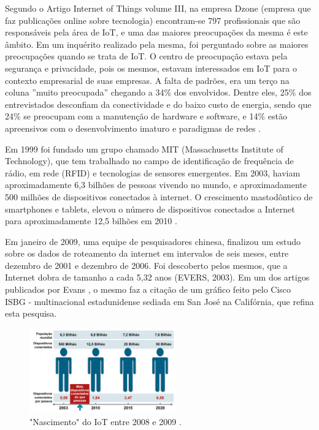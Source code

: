 \documentclass[journal]{IEEEtran}
\begin{document}
Segundo o Artigo Internet of Things volume III, na empresa Dzone (empresa que faz publicações online sobre tecnologia) encontram-se 797 profissionais que são responsáveis pela área de IoT, e uma das maiores preocupações da mesma é este âmbito. Em um inquérito realizado pela mesma, foi perguntado sobre as maiores preocupações quando se trata de IoT. O centro de preocupação estava pela segurança e privacidade, pois os mesmos, estavam interessados em IoT para o contexto empresarial de suas empresas. A falta de padrões, era um terço na coluna ''muito preocupada'' chegando a 34\% dos envolvidos. Dentre eles, 25\% dos entrevistados desconfiam da conectividade e do baixo custo de energia, sendo que 24\% se preocupam com a manutenção de hardware e software, e 14\% estão apreensivos com o desenvolvimento imaturo e paradigmas de redes \cite[p.~4]{Evans}.

Em 1999 foi fundado um grupo chamado MIT (Massachusetts Institute of Technology), que tem trabalhado no campo de identificação de frequência de rádio, em rede (RFID) e tecnologias de sensores emergentes. Em 2003, haviam aproximadamente 6,3 bilhões de pessoas vivendo no mundo, e aproximadamente 500 milhões de dispositivos conectados à internet. O crescimento mastodôntico de smartphones e tablets, elevou o número de dispositivos conectados a Internet para aproximadamente 12,5 bilhões em 2010 \cite[p.~3]{Evans}.

Em janeiro de 2009, uma equipe de pesquisadores chinesa, finalizou um estudo sobre os dados de roteamento da internet em intervalos de seis meses, entre dezembro de 2001 e dezembro de 2006. Foi descoberto pelos mesmos, que a Internet dobra de tamanho a cada 5,32 anos (EVERS, 2003). Em um dos artigos publicados por Evans \cite{Evans}, o mesmo faz a citação de um gráfico feito pelo Cisco ISBG - multinacional estadunidense sediada em San José na Califórnia, que refina esta pesquisa. 

\begin{figure}[h]
\centering
\includegraphics[width=2.5in]{um}
\caption{"Nascimento" do IoT entre 2008 e 2009 \cite{Evans}.}
\label{fig_um}
\end{figure}
\end{document}
